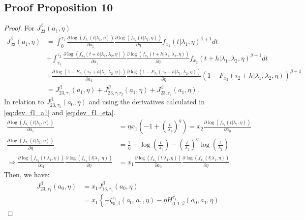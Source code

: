 \documentclass{article}
\begin{document}
\subsection{Proof Proposition 10}
\begin{proof}
For $J_{23}^{\beta}(a_1,\eta)$
\begin{align*}
J_{23}^{\beta}(a_1,\eta)&=\int_{0}^{\tau_1}\frac{\partial \log\left(f_{x_1}(t|\lambda_1,\eta)\right)}{\partial a_1}\frac{\partial \log\left(f_{x_1}(t|\lambda_1,\eta)\right)}{\partial \eta}f_{x_1}(t|\lambda_1,\eta)^{\beta+1}dt
\\
&+\int_{\tau_1}^{\tau_2}\frac{\partial \log\left(f_{x_2}(t+h|\lambda_1,\lambda_2,\eta)\right)}{\partial a_1}\frac{\partial \log\left(f_{x_2}(t+h|\lambda_1,\lambda_2,\eta)\right)}{\partial \eta}f_{x_2}(t+h|\lambda_1,\lambda_2,\eta)^{\beta+1}dt
\\
&+\frac{\partial \log\left(1-F_{x_2}(\tau_2+h|\lambda_1,\lambda_2,\eta)\right)}{\partial a_1}\frac{\partial \log\left(1-F_{x_2}(\tau_2+h|\lambda_1,\lambda_2,\eta)\right)}{\partial \eta}\left(1-F_{x_2}(\tau_2+h|\lambda_1,\lambda_2,\eta)\right)^{\beta+1}
\\
&=J_{23,\tau_1}^{\beta}(a_1,\eta)+J_{23,\tau_1\tau_2}^{\beta}(a_1,\eta)+J_{23,\tau_2}^{\beta}(a_1,\eta).
\end{align*}
In relation to  $J_{23,\tau_1}^{\beta}(a_0,\eta)$ and using the derivatives calculated in  \eqref{eq:dev_f1_a1} and \eqref{eq:dev_f1_eta}.
\begin{align*}
\frac{\partial \log(f_{x_1}(t|\lambda_1,\eta))}{\partial a_1}&=\eta x_1 \left(-1+\left(\frac{t}{\lambda_1}\right)^{\eta}\right)=x_2\frac{\partial \log(f_{x_1}(t|\lambda_1,\eta))}{\partial a_0}
 \\
 \frac{\partial \log(f_{x_1}(t|\lambda_1,\eta))}{\partial \eta}&=\frac{1}{\eta}+\log\left(\frac{t}{\lambda_1}\right)-\left(\frac{t}{\lambda_1}\right)^{\eta}\log\left(\frac{t}{\lambda_1}\right)
 \\
 \Rightarrow \frac{\partial \log(f_{x_1}(t|\lambda_1,\eta))}{\partial a_1} \frac{\partial \log(f_{x_1}(t|\lambda_1,\eta))}{\partial \eta}&=x_1\frac{\partial \log(f_{x_1}(t|\lambda_1,\eta))}{\partial a_0} \frac{\partial \log(f_{x_1}(t|\lambda_1,\eta))}{\partial \eta}.
\end{align*}
Then, we have:
\begin{align*}
J_{23,\tau_1}^{\beta}(a_0,\eta)&=x_1 J_{13,\tau_1}^{\beta}(a_0,\eta)
\\
&=x_1\left\{ -\zeta_{0,\beta}^{\tau_1}(a_0,a_1,\eta)
-\eta H_{0,1,\beta}^{\tau_1}(a_0,a_1,\eta)

\end{align*}
\end{proof}
\end{document}
